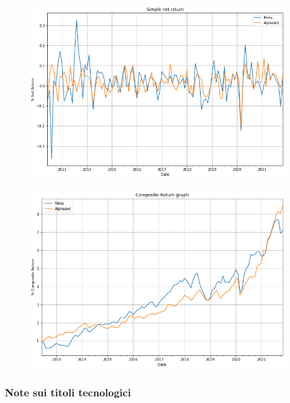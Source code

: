 \documentclass{article}
\begin{document}
\begin{figure}[h]
    \centering
    \begin{minipage}{.5\textwidth}
      \centering
      \includegraphics[width=1\linewidth]{tecno_rendimenti_semplici_netti.png}
      \label{fig:rendimenti_semplici_tecno}
    \end{minipage}%
    \begin{minipage}{.5\textwidth}
      \centering
      \includegraphics[width=.97\linewidth]{tecno_rendimenti_composti.png}
      \label{fig:rendimenti_compositi_tecno}
    \end{minipage}
\end{figure}

\subsubsection{Note sui titoli tecnologici}
\end{document}

